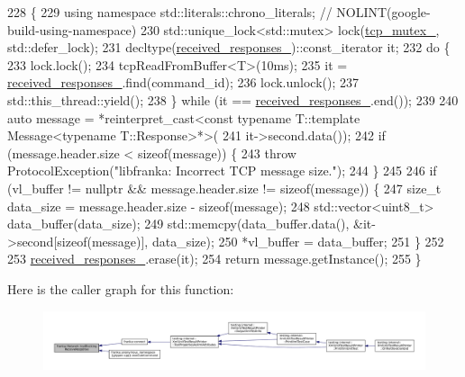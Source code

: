 \begin{DoxyCode}
228                                                                                         \{
229   \textcolor{keyword}{using namespace }std::literals::chrono\_literals;  \textcolor{comment}{// NOLINT(google-build-using-namespace)}
230   std::unique\_lock<std::mutex> lock(\hyperlink{classfranka_1_1Network_a8649d1cc6577ba09f7444c298905a11d}{tcp\_mutex\_}, std::defer\_lock);
231   decltype(\hyperlink{classfranka_1_1Network_a99270a962346224117a68e309a01e054}{received\_responses\_})::const\_iterator it;
232   \textcolor{keywordflow}{do} \{
233     lock.lock();
234     tcpReadFromBuffer<T>(10ms);
235     it = \hyperlink{classfranka_1_1Network_a99270a962346224117a68e309a01e054}{received\_responses\_}.find(command\_id);
236     lock.unlock();
237     std::this\_thread::yield();
238   \} \textcolor{keywordflow}{while} (it == \hyperlink{classfranka_1_1Network_a99270a962346224117a68e309a01e054}{received\_responses\_}.end());
239 
240   \textcolor{keyword}{auto} message = *\textcolor{keyword}{reinterpret\_cast<}\textcolor{keyword}{const }typename T::template Message<typename T::Response>*\textcolor{keyword}{>}(
241       it->second.data());
242   \textcolor{keywordflow}{if} (message.header.size < \textcolor{keyword}{sizeof}(message)) \{
243     \textcolor{keywordflow}{throw} ProtocolException(\textcolor{stringliteral}{"libfranka: Incorrect TCP message size."});
244   \}
245 
246   \textcolor{keywordflow}{if} (vl\_buffer != \textcolor{keyword}{nullptr} && message.header.size != \textcolor{keyword}{sizeof}(message)) \{
247     \textcolor{keywordtype}{size\_t} data\_size = message.header.size - \textcolor{keyword}{sizeof}(message);
248     std::vector<uint8\_t> data\_buffer(data\_size);
249     std::memcpy(data\_buffer.data(), &it->second[\textcolor{keyword}{sizeof}(message)], data\_size);
250     *vl\_buffer = data\_buffer;
251   \}
252 
253   \hyperlink{classfranka_1_1Network_a99270a962346224117a68e309a01e054}{received\_responses\_}.erase(it);
254   \textcolor{keywordflow}{return} message.getInstance();
255 \}
\end{DoxyCode}
Here is the caller graph for this function\+:
\nopagebreak
\begin{figure}[H]
\begin{center}
\leavevmode
\includegraphics[width=350pt]{classfranka_1_1Network_ae946c4dc9673902bd3e40a1bef65862a_icgraph}
\end{center}
\end{figure}
\mbox{\label{classfranka_1_1Network_a99a8575b86f0b4ddc206b67483cd65aa}} 
